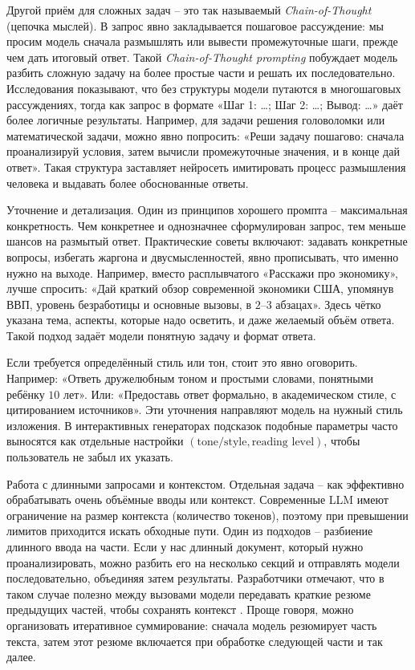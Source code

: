 Другой приём для сложных задач – это так называемый \textit{Chain-of-Thought} (цепочка мыслей). В запрос явно закладывается пошаговое рассуждение: мы просим модель сначала размышлять или вывести промежуточные шаги, прежде чем дать итоговый ответ. Такой \textit{Chain-of-Thought prompting} побуждает модель разбить сложную задачу на более простые части и решать их последовательно\cite{lakera:2025}. Исследования показывают, что без структуры модели путаются в многошаговых рассуждениях, тогда как запрос в формате «Шаг 1: \dots; Шаг 2: \dots; Вывод: \dots» даёт более логичные результаты\cite{lakera:2025}. Например, для задачи решения головоломки или математической задачи, можно явно попросить: «Реши задачу пошагово: сначала проанализируй условия, затем вычисли промежуточные значения, и в конце дай ответ». Такая структура заставляет нейросеть имитировать процесс размышления человека и выдавать более обоснованные ответы.

Уточнение и детализация. Один из принципов хорошего промпта – максимальная конкретность. Чем конкретнее и однозначнее сформулирован запрос, тем меньше шансов на размытый ответ. Практические советы включают: задавать конкретные вопросы, избегать жаргона и двусмысленностей, явно прописывать, что именно нужно на выходе\cite{lakera:2025}. Например, вместо расплывчатого «Расскажи про экономику», лучше спросить: «Дай краткий обзор современной экономики США, упомянув ВВП, уровень безработицы и основные вызовы, в \(2\)–\(3\) абзацах». Здесь чётко указана тема, аспекты, которые надо осветить, и даже желаемый объём ответа. Такой подход задаёт модели понятную задачу и формат ответа\cite{copilotworks:promptgen}.

Если требуется определённый стиль или тон, стоит это явно оговорить. Например: «Ответь дружелюбным тоном и простыми словами, понятными ребёнку \(10\) лет». Или: «Предоставь ответ формально, в академическом стиле, с цитированием источников». Эти уточнения направляют модель на нужный стиль изложения. В интерактивных генераторах подсказок подобные параметры часто выносятся как отдельные настройки \((\text{tone/style}, \text{reading level})\), чтобы пользователь не забыл их указать\cite{copilotworks:promptgen}.

Работа с длинными запросами и контекстом. Отдельная задача – как эффективно обрабатывать очень объёмные вводы или контекст. Современные LLM имеют ограничение на размер контекста (количество токенов), поэтому при превышении лимитов приходится искать обходные пути. Один из подходов – разбиение длинного ввода на части. Если у нас длинный документ, который нужно проанализировать, можно разбить его на несколько секций и отправлять модели последовательно, объединяя затем результаты. Разработчики отмечают, что в таком случае полезно между вызовами модели передавать краткие резюме предыдущих частей, чтобы сохранять контекст \cite{openai:longprompts}. Проще говоря, можно организовать итеративное суммирование: сначала модель резюмирует часть текста, затем этот резюме включается при обработке следующей части и так далее.

